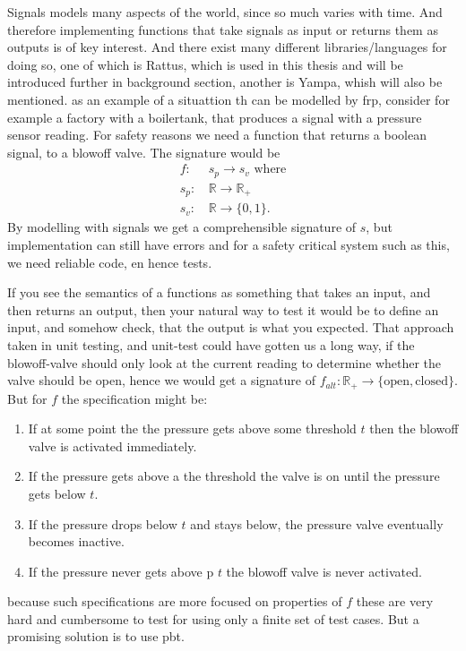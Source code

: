 \par Signals models many aspects of the world, since so much varies with time. And therefore implementing functions that take signals as input or returns them as outputs is of key interest. And there exist many different libraries/languages for doing so, one of which is Rattus\parencite{rattus}, which is used in this thesis and will be introduced further in background section, another is Yampa\parencite{yampa}, whish will also be mentioned.  as an example of a situattion th can be modelled by \acrshort{frp}, consider for example a factory with a boilertank, that produces a signal with a pressure sensor reading. For safety reasons we need a function that returns a boolean signal, to a blowoff valve. The signature would be 
\begin{align*}
    f:&\, s_{p} \rightarrow s_{v} \text{  where}\\
    s_{p}:&\, \mathbb{R} \rightarrow \mathbb{R_+}\\ 
    s_{v}:&\, \mathbb{R} \rightarrow \{0,1\}.
\end{align*}
By modelling with signals we get a comprehensible signature of $s$, but implementation can still have errors and for a safety critical system such as this, we need reliable code, en hence tests. 
\par  If you see the semantics of a functions as something that takes an input, and then returns an output, then your natural way to test it would be to define an input, and somehow check, that the output is what you expected. That approach taken in unit testing, and unit-test could have gotten us a long way, if the blowoff-valve should only look at the current reading to determine whether the valve should be open, hence we would get a signature of $f_{alt}:\mathbb{R_+} \rightarrow \{\text{open},\text{closed}\}$. But for $f$ the specification might be:
\begin{enumerate}
    \item If at some point the the pressure gets above some threshold $t$ then the blowoff valve is activated immediately.
    \item If the pressure gets above a the threshold the valve is on until the pressure gets below $t$.
    \item If the pressure drops below $t$ and stays below, the pressure valve eventually becomes inactive.
    \item If the pressure never gets above p $t$ the blowoff valve is never activated.
\end{enumerate}
because such specifications are more focused on properties of $f$ these are very hard and cumbersome to test for using only a finite set of test cases. But a promising solution is to use \acrlong{pbt}.

